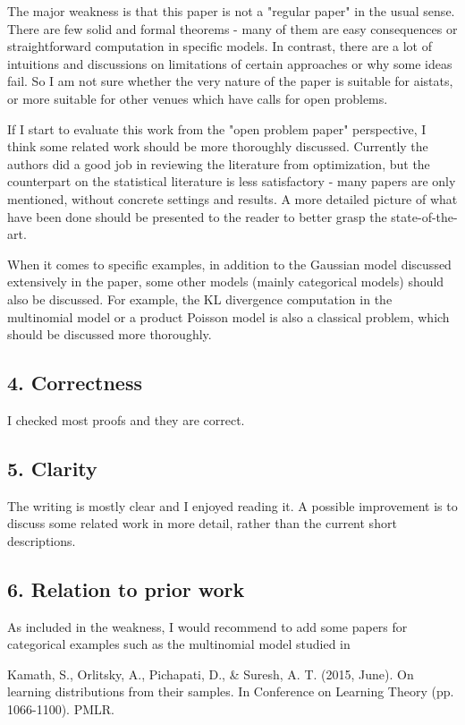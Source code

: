 The major weakness is that this paper is not a "regular paper" in the usual sense. There are few solid and formal theorems - many of them are easy consequences or straightforward computation in specific models. In contrast, there are a lot of intuitions and discussions on limitations of certain approaches or why some ideas fail. So I am not sure whether the very nature of the paper is suitable for aistats, or more suitable for other venues which have calls for open problems.

If I start to evaluate this work from the "open problem paper" perspective, I think some related work should be more thoroughly discussed. Currently the authors did a good job in reviewing the literature from optimization, but the counterpart on the statistical literature is less satisfactory - many papers are only mentioned, without concrete settings and results. A more detailed picture of what have been done should be presented to the reader to better grasp the state-of-the-art.

When it comes to specific examples, in addition to the Gaussian model discussed extensively in the paper, some other models (mainly categorical models) should also be discussed. For example, the KL divergence computation in the multinomial model or a product Poisson model is also a classical problem, which should be discussed more thoroughly.

\subsection*{4. Correctness}

I checked most proofs and they are correct.

\subsection*{5. Clarity}

The writing is mostly clear and I enjoyed reading it. A possible improvement is to discuss some related work in more detail, rather than the current short descriptions.

\subsection*{6. Relation to prior work}

As included in the weakness, I would recommend to add some papers for categorical examples such as the multinomial model studied in

Kamath, S., Orlitsky, A., Pichapati, D., \& Suresh, A. T. (2015, June). On learning distributions from their samples. In Conference on Learning Theory (pp. 1066-1100). PMLR.

